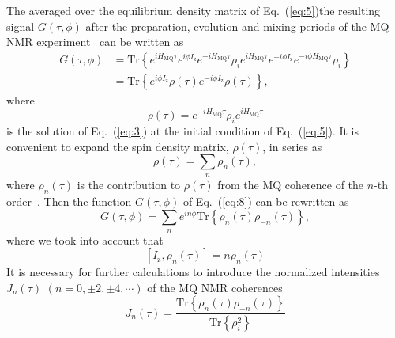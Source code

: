 \documentclass[review]{elsarticle}
\begin{document}
The averaged over the equilibrium density matrix of Eq.~(\ref{eq:5})the resulting signal $G(\tau,\phi)$ after the preparation, evolution and mixing periods of the MQ NMR experiment~\cite{Baum_1985} can be written as~\cite{Doronin_2019} 
%
\begin{equation}
    \begin{split}
        \label{eq:8}
        G(\tau,\phi) 
        & = \mathrm{Tr}\left\{
            e^{i H_\mathrm{MQ} \tau} e^{i\phi I_\mathrm{z}} e^{-i H_\mathrm{MQ}\tau} 
            \rho_i 
            e^{i H_\mathrm{MQ} \tau} e^{-i \phi I_\mathrm{z}} e^{-i \phi H_\mathrm{MQ} \tau} 
            \rho_i 
        \right\} \\
        & = \mathrm{Tr} \left\{
        e^{i \phi I_\mathrm{z}}
        \rho(\tau) 
        e^{-i \phi I_\mathrm{z}} 
        \rho(\tau) 
        \right\},
    \end{split}
\end{equation}
%
where
%
\begin{equation}
    \label{eq:9}
    \rho(\tau) 
    = e^{-i H_\mathrm{MQ} \tau } 
    \rho_i 
    e^{i H_\mathrm{MQ} \tau}
\end{equation}
%
is the solution of Eq.~(\ref{eq:3}) at the initial condition of Eq.~(\ref{eq:5}).
It is convenient to expand the spin density matrix, $\rho(\tau)$, in series as
%
\begin{equation}
    \label{eq:10}
    \rho(\tau) = \sum\limits_n \rho_n(\tau),
\end{equation}
%
where $\rho_{n}(\tau)$ is the contribution to $\rho(\tau)$ from the MQ coherence of the $n$-th order~\cite{Fel_dman_1996}.
Then the function $G(\tau,\phi)$ of Eq.~(\ref{eq:8}) can be rewritten as 
%
\begin{equation}
    \label{eq:11}
    G(\tau,\phi) 
    = \sum\limits_n e^{i n \phi} \mathrm{Tr} \left\{ 
        \rho_{n}(\tau) \rho_{-n}(\tau) 
    \right\},
\end{equation}
%
where we took into account that
%
\begin{equation}
    \label{eq:12}
    \left[ I_{\mathrm{z}},\rho_n(\tau) \right] = n \rho_n(\tau)
\end{equation}
%
It is necessary for further calculations to introduce the normalized intensities $J_{n}(\tau)$ $(n=0, \pm 2, \pm 4, \cdots)$ of the MQ NMR coherences
%
\begin{equation}
    \label{eq:13}
    J_{n}(\tau) = \dfrac{\mathrm{Tr} \left\{
    \rho_{n}(\tau) \rho_{-n}(\tau) 
    \right\}} 
    {\mathrm{Tr} \left\{\rho^2_{i} \right\}}
\end{equation}
\end{document}
